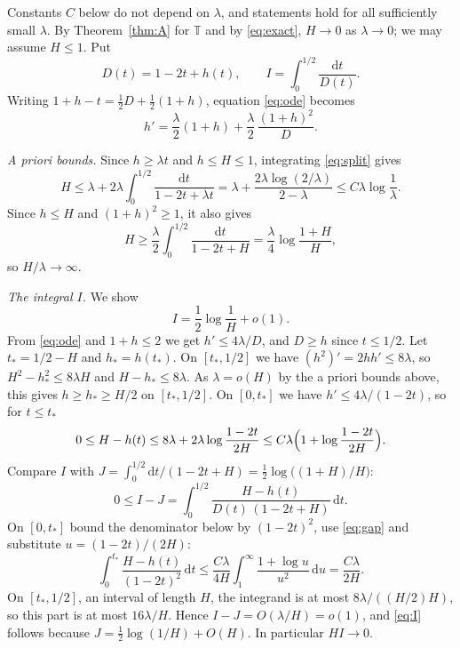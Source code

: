 \documentclass[11pt]{amsart}
\theoremstyle{remark}
\numberwithin{equation}{section}
\newcommand{\T}{\mathbb{T}}
\newcommand{\dd}{\mathrm{d}}
\begin{document}
Constants $C$ below do not depend on $\lambda$, and statements hold for
all sufficiently small $\lambda$. By Theorem~\ref{thm:A} for $\T$ and by
\eqref{eq:exact}, $H\to0$ as $\lambda\to0$; we may assume $H\le1$. Put
\[
D(t)=1-2t+h(t),\qquad I=\int_0^{1/2}\frac{\dd t}{D(t)}.
\]
Writing $1+h-t=\frac12D+\frac12(1+h)$, equation \eqref{eq:ode} becomes
\begin{equation}\label{eq:split}
h'=\frac\lambda2(1+h)+\frac\lambda2\,\frac{(1+h)^2}{D}.
\end{equation}

\emph{A priori bounds.} Since $h\ge\lambda t$ and $h\le H\le1$,
integrating \eqref{eq:split} gives
\[
H\le\lambda+2\lambda\int_0^{1/2}\frac{\dd t}{1-2t+\lambda t}
=\lambda+\frac{2\lambda\log(2/\lambda)}{2-\lambda}
\le C\lambda\log\frac1\lambda .
\]
Since $h\le H$ and $(1+h)^2\ge1$, it also gives
\[
H\ge\frac\lambda2\int_0^{1/2}\frac{\dd t}{1-2t+H}
=\frac\lambda4\log\frac{1+H}{H},
\]
so $H/\lambda\to\infty$.

\emph{The integral $I$.} We show
\begin{equation}\label{eq:I}
I=\frac12\log\frac1H+o(1).
\end{equation}
From \eqref{eq:ode} and $1+h\le2$ we get $h'\le4\lambda/D$, and $D\ge h$
since $t\le1/2$. Let $t_*=1/2-H$ and $h_*=h(t_*)$. On $[t_*,1/2]$ we have
$(h^2)'=2hh'\le8\lambda$, so $H^2-h_*^2\le8\lambda H$ and
$H-h_*\le8\lambda$. As $\lambda=o(H)$ by the a priori bounds above, this gives $h\ge h_*\ge H/2$ on
$[t_*,1/2]$. On $[0,t_*]$ we have $h'\le4\lambda/(1-2t)$, so for
$t\le t_*$
\begin{equation}\label{eq:gap}
0\le H-h(t)\le8\lambda+2\lambda\log\frac{1-2t}{2H}
\le C\lambda\Bigl(1+\log\frac{1-2t}{2H}\Bigr).
\end{equation}
Compare $I$ with
$J=\int_0^{1/2}\dd t/(1-2t+H)=\frac12\log\bigl((1+H)/H\bigr)$:
\[
0\le I-J=\int_0^{1/2}\frac{H-h(t)}{D(t)\,(1-2t+H)}\,\dd t .
\]
On $[0,t_*]$ bound the denominator below by $(1-2t)^2$, use
\eqref{eq:gap} and substitute $u=(1-2t)/(2H)$:
\[
\int_0^{t_*}\frac{H-h(t)}{(1-2t)^2}\,\dd t
\le\frac{C\lambda}{4H}\int_1^\infty\frac{1+\log u}{u^2}\,\dd u
=\frac{C\lambda}{2H}.
\]
On $[t_*,1/2]$, an interval of length $H$, the integrand is at most
$8\lambda/((H/2)H)$, so this part is at most $16\lambda/H$. Hence
$I-J=O(\lambda/H)=o(1)$, and \eqref{eq:I} follows because
$J=\frac12\log(1/H)+O(H)$. In particular $HI\to0$.
\end{document}
